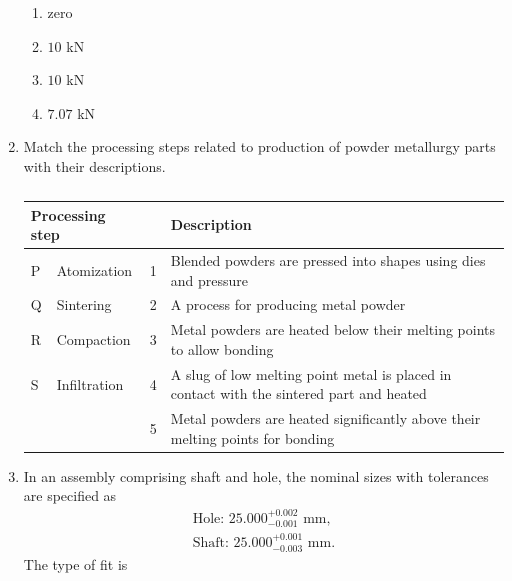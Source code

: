 \documentclass[journal,12pt,onecolumn]{IEEEtran}
\theoremstyle{remark}
\begin{document}
\begin{enumerate}
    \hfill{}
    \begin{enumerate}
        \item zero
        \item $10$ kN 
        \item $10$ kN 
        \item $7.07$ kN 
    \end{enumerate}

    \item Match the processing steps related to production of powder metallurgy parts with their descriptions.
    \begin{table}[h]
        \centering
        \caption*{}
        \label{tab:q41}
        \begin{tabular}{llcl}
            \hline
            \multicolumn{2}{l}{Processing step} & & Description \\
            \hline
            P & Atomization & 1 & Blended powders are pressed into shapes using dies and pressure \\
            Q & Sintering & 2 & A process for producing metal powder \\
            R & Compaction & 3 & Metal powders are heated below their melting points to allow bonding \\
            S & Infiltration & 4 & A slug of low melting point metal is placed in contact with the sintered part and heated \\
              &             & 5 & Metal powders are heated significantly above their melting points for bonding \\
            \hline
        \end{tabular}
    \end{table}

    \hfill{}
    \begin{enumerate}
    \end{enumerate}

    \item In an assembly comprising shaft and hole, the nominal sizes with tolerances are specified as
    \begin{align*}
        \text{Hole: } 25.000^{+0.002}_{-0.001} \text{ mm,} \\
        \text{Shaft: } 25.000^{+0.001}_{-0.003} \text{ mm.}
    \end{align*}
    The type of fit is


\end{enumerate}
\end{document}

